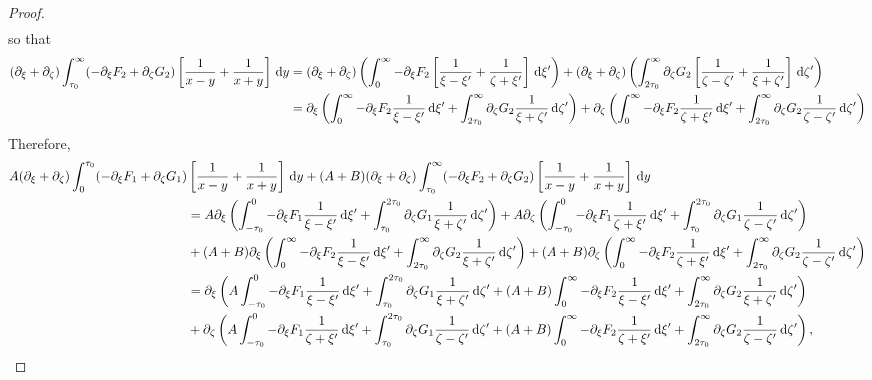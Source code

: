 \documentclass[10pt,reqno,oneside,a4paper, landscape]{article}
\begin{document}
\begin{proof}
\begin{align*}
\end{align*}
so that 
\begin{align*}
(\partial_\xi + \partial_\zeta) \int_{\tau_0}^\infty (- \partial_\xi F_2+ \partial_\zeta G_2) \left[ \frac{1}{x-y} + \frac{1}{x+y} \right] \,\mathrm{d} y &=  (\partial_\xi + \partial_\zeta) \left( \int_0^{\infty} -\partial_\xi F_2 \left[ \frac{1}{\xi - \xi'} + \frac{1}{\zeta + \xi'} \right] \,\mathrm{d} \xi' \right)+ (\partial_\xi + \partial_\zeta)\left( \int_{2\tau_0}^{\infty} \partial_\zeta G_2 \left[ \frac{1}{\zeta - \zeta'} + \frac{1}{\xi + \zeta'}  \right] \,\mathrm{d} \zeta' \right) \\
&=\partial_\xi \left( \int_0^{\infty} -\partial_\xi F_2 \frac{1}{\xi - \xi'} \,\mathrm{d} \xi' + \int_{2\tau_0}^{\infty} \partial_\zeta G_2 \frac{1}{\xi + \zeta'} \,\mathrm{d} \zeta'  \right) + \partial_\zeta \left( \int_0^{\infty} -\partial_\xi F_2  \frac{1}{\zeta + \xi'} \,\mathrm{d} \xi'  + \int_{2\tau_0}^{\infty} \partial_\zeta G_2 \frac{1}{\zeta - \zeta'}\,\mathrm{d} \zeta' \right)
\end{align*}
Therefore,
\begin{align*}
A (\partial_\xi + \partial_\zeta)\int_0^{\tau_0} (-\partial_\xi F_1 + \partial_\zeta G_1) &\left[ \frac{1}{x-y} + \frac{1}{x+y} \right] \D y + (A+B)(\partial_\xi + \partial_\zeta)\int_{\tau_0}^\infty (- \partial_\xi F_2+ \partial_\zeta G_2) \left[ \frac{1}{x-y} + \frac{1}{x+y} \right] \D y \\
&= A \partial_\xi \left( \int^0_{-\tau_0} -\partial_\xi F_1 \frac{1}{\xi - \xi'} \D \xi' + \int^{2\tau_0}_{\tau_0} \partial_\zeta G_1 \frac{1}{\xi + \zeta'} \D \zeta' \right) + A \partial_\zeta \left( \int^0_{-\tau_0} -\partial_\xi F_1  \frac{1}{\zeta + \xi'}  \D \xi' + \int^{2\tau_0}_{\tau_0} \partial_\zeta G_1 \frac{1}{\zeta - \zeta'} \D \zeta' \right) \\
&+ (A+B) \partial_\xi \left( \int_0^{\infty} -\partial_\xi F_2 \frac{1}{\xi - \xi'} \D \xi' + \int_{2\tau_0}^{\infty} \partial_\zeta G_2 \frac{1}{\xi + \zeta'} \D \zeta'  \right) + (A+B) \partial_\zeta \left( \int_0^{\infty} -\partial_\xi F_2  \frac{1}{\zeta + \xi'} \D \xi'  + \int_{2\tau_0}^{\infty} \partial_\zeta G_2 \frac{1}{\zeta - \zeta'}\D \zeta' \right) \\
&= \partial_\xi \left( A \int^0_{-\tau_0} -\partial_\xi F_1 \frac{1}{\xi - \xi'} \D \xi' + \int^{2\tau_0}_{\tau_0} \partial_\zeta G_1 \frac{1}{\xi + \zeta'} \D \zeta' + (A+B)\int_0^{\infty} -\partial_\xi F_2 \frac{1}{\xi - \xi'} \D \xi' + \int_{2\tau_0}^{\infty} \partial_\zeta G_2 \frac{1}{\xi + \zeta'} \D \zeta' \right) \\
&+ \partial_\zeta \left( A \int^0_{-\tau_0} -\partial_\xi F_1  \frac{1}{\zeta + \xi'}  \D \xi' + \int^{2\tau_0}_{\tau_0} \partial_\zeta G_1 \frac{1}{\zeta - \zeta'} \D \zeta' + (A+B) \int_0^{\infty} -\partial_\xi F_2  \frac{1}{\zeta + \xi'} \D \xi'  + \int_{2\tau_0}^{\infty} \partial_\zeta G_2 \frac{1}{\zeta - \zeta'}\D \zeta'  \right),

\end{align*}
\end{proof}
\end{document}
